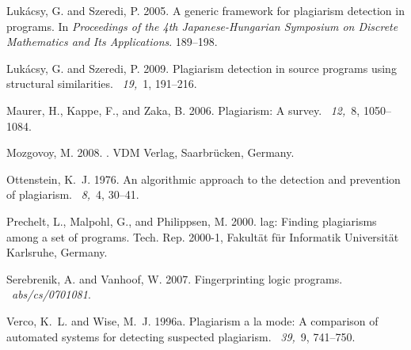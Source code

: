 \documentclass{tlp}
\begin{document}
\begin{thebibliography}{}
{\sc Luk\'{a}csy, G.} {\sc and} {\sc Szeredi, P.} 2005.
\newblock A generic framework for plagiarism detection in programs.
\newblock In {\em Proceedings of the 4th Japanese-Hungarian Symposium on
  Discrete Mathematics and Its Applications}. 189--198.

{\sc Luk{\'a}csy, G.} {\sc and} {\sc Szeredi, P.} 2009.
\newblock Plagiarism detection in source programs using structural
  similarities.
~{\em 19,\/}~1, 191--216.

{\sc Maurer, H.}, {\sc Kappe, F.}, {\sc and} {\sc Zaka, B.} 2006.
\newblock Plagiarism: {A} survey.
~{\em 12,\/}~8,
  1050--1084.

{\sc Mozgovoy, M.} 2008.
.
\newblock VDM Verlag, Saar\-br\"{u}cken, Germany.

{\sc Ottenstein, K.~J.} 1976.
\newblock An algorithmic approach to the detection and prevention of
  plagiarism.
~{\em 8,\/}~4, 30--41.

{\sc Prechelt, L.}, {\sc Malpohl, G.}, {\sc and} {\sc Philippsen, M.} 2000.
lag: Finding plagiarisms among a set of programs.
\newblock Tech. Rep. 2000-1, Fakult{\"{a}}t f{\"{u}}r Informatik
  Universit{\"{a}}t Karlsruhe, Germany.

{\sc Serebrenik, A.} {\sc and} {\sc Vanhoof, W.} 2007.
\newblock Fingerprinting logic programs.
~{\em abs/cs/0701081}.

{\sc Verco, K.~L.} {\sc and} {\sc Wise, M.~J.} 1996a.
\newblock Plagiarism a la mode: A comparison of automated systems for detecting
  suspected plagiarism.
~{\em 39,\/}~9, 741--750.


\end{thebibliography}
\end{document}
